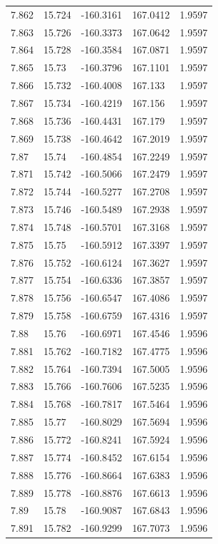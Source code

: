 \begin{tabular}{lllll}
7.862 & 15.724 & -160.3161 & 167.0412 & 1.9597 \\
7.863 & 15.726 & -160.3373 & 167.0642 & 1.9597 \\
7.864 & 15.728 & -160.3584 & 167.0871 & 1.9597 \\
7.865 & 15.73 & -160.3796 & 167.1101 & 1.9597 \\
7.866 & 15.732 & -160.4008 & 167.133 & 1.9597 \\
7.867 & 15.734 & -160.4219 & 167.156 & 1.9597 \\
7.868 & 15.736 & -160.4431 & 167.179 & 1.9597 \\
7.869 & 15.738 & -160.4642 & 167.2019 & 1.9597 \\
7.87 & 15.74 & -160.4854 & 167.2249 & 1.9597 \\
7.871 & 15.742 & -160.5066 & 167.2479 & 1.9597 \\
7.872 & 15.744 & -160.5277 & 167.2708 & 1.9597 \\
7.873 & 15.746 & -160.5489 & 167.2938 & 1.9597 \\
7.874 & 15.748 & -160.5701 & 167.3168 & 1.9597 \\
7.875 & 15.75 & -160.5912 & 167.3397 & 1.9597 \\
7.876 & 15.752 & -160.6124 & 167.3627 & 1.9597 \\
7.877 & 15.754 & -160.6336 & 167.3857 & 1.9597 \\
7.878 & 15.756 & -160.6547 & 167.4086 & 1.9597 \\
7.879 & 15.758 & -160.6759 & 167.4316 & 1.9597 \\
7.88 & 15.76 & -160.6971 & 167.4546 & 1.9596 \\
7.881 & 15.762 & -160.7182 & 167.4775 & 1.9596 \\
7.882 & 15.764 & -160.7394 & 167.5005 & 1.9596 \\
7.883 & 15.766 & -160.7606 & 167.5235 & 1.9596 \\
7.884 & 15.768 & -160.7817 & 167.5464 & 1.9596 \\
7.885 & 15.77 & -160.8029 & 167.5694 & 1.9596 \\
7.886 & 15.772 & -160.8241 & 167.5924 & 1.9596 \\
7.887 & 15.774 & -160.8452 & 167.6154 & 1.9596 \\
7.888 & 15.776 & -160.8664 & 167.6383 & 1.9596 \\
7.889 & 15.778 & -160.8876 & 167.6613 & 1.9596 \\
7.89 & 15.78 & -160.9087 & 167.6843 & 1.9596 \\
7.891 & 15.782 & -160.9299 & 167.7073 & 1.9596 \\

\end{tabular}
